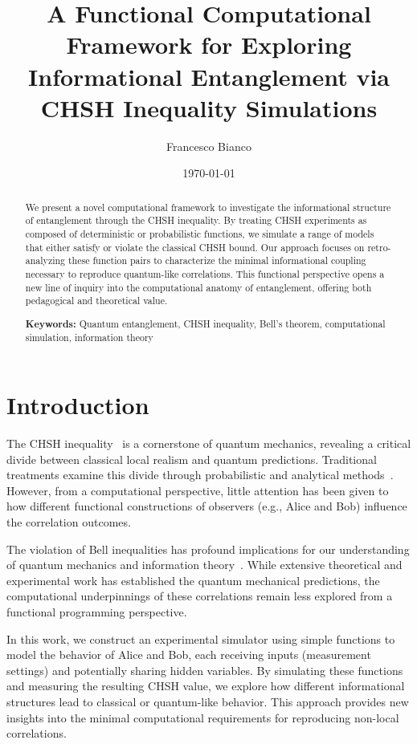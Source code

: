 \documentclass[11pt,a4paper]{article}
\begin{document}
\title{A Functional Computational Framework for Exploring Informational Entanglement via CHSH Inequality Simulations}

\author{Francesco Bianco}

\date{\today}

\maketitle

\begin{abstract}
We present a novel computational framework to investigate the informational structure of entanglement through the CHSH inequality. By treating CHSH experiments as composed of deterministic or probabilistic functions, we simulate a range of models that either satisfy or violate the classical CHSH bound. Our approach focuses on retro-analyzing these function pairs to characterize the minimal informational coupling necessary to reproduce quantum-like correlations. This functional perspective opens a new line of inquiry into the computational anatomy of entanglement, offering both pedagogical and theoretical value.

\textbf{Keywords:} Quantum entanglement, CHSH inequality, Bell's theorem, computational simulation, information theory
\end{abstract}

\section{Introduction}

The CHSH inequality~\cite{clauser1969} is a cornerstone of quantum mechanics, revealing a critical divide between classical local realism and quantum predictions. Traditional treatments examine this divide through probabilistic and analytical methods~\cite{bell1964}. However, from a computational perspective, little attention has been given to how different functional constructions of observers (e.g., Alice and Bob) influence the correlation outcomes.

The violation of Bell inequalities has profound implications for our understanding of quantum mechanics and information theory~\cite{brassard2005}. While extensive theoretical and experimental work has established the quantum mechanical predictions, the computational underpinnings of these correlations remain less explored from a functional programming perspective.

In this work, we construct an experimental simulator using simple functions to model the behavior of Alice and Bob, each receiving inputs (measurement settings) and potentially sharing hidden variables. By simulating these functions and measuring the resulting CHSH value, we explore how different informational structures lead to classical or quantum-like behavior. This approach provides new insights into the minimal computational requirements for reproducing non-local correlations.
\end{document}
